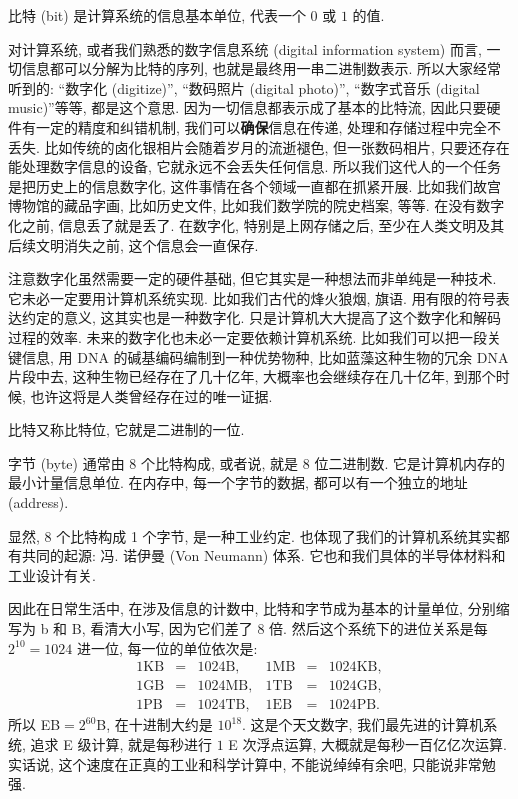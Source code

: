 \documentclass[a4paper]{ctexart}
\begin{document}
{ 比特 (bit) 是计算系统的信息基本单位,
代表一个 $0$ 或 $1$ 的值.

对计算系统, 或者我们熟悉的数字信息系统
(digital information system) 而言, 一切信息都可以分解为比特的序列,
也就是最终用一串二进制数表示. 所以大家经常听到的: ``数字化 (digitize)'',
``数码照片 (digital photo)'', ``数字式音乐 (digital music)''等等,
都是这个意思. 因为一切信息都表示成了基本的比特流,
因此只要硬件有一定的精度和纠错机制, 我们可以{\bf 确保}信息在传递,
处理和存储过程中完全不丢失. 比如传统的卤化银相片会随着岁月的流逝褪色,
但一张数码相片, 只要还存在能处理数字信息的设备, 它就永远不会丢失任何信息.
所以我们这代人的一个任务是把历史上的信息数字化, 这件事情在各个领域一直都在抓紧开展.
比如我们故宫博物馆的藏品字画, 比如历史文件, 比如我们数学院的院史档案, 等等.
在没有数字化之前, 信息丢了就是丢了. 在数字化, 特别是上网存储之后,
至少在人类文明及其后续文明消失之前, 这个信息会一直保存.

注意数字化虽然需要一定的硬件基础, 但它其实是一种想法而非单纯是一种技术.
它未必一定要用计算机系统实现. 比如我们古代的烽火狼烟, 旗语. 用有限的符号表达约定的意义,
这其实也是一种数字化. 只是计算机大大提高了这个数字化和解码过程的效率.
未来的数字化也未必一定要依赖计算机系统. 比如我们可以把一段关键信息,
用 DNA 的碱基编码编制到一种优势物种, 比如蓝藻这种生物的冗余 DNA 片段中去,
这种生物已经存在了几十亿年, 大概率也会继续存在几十亿年, 到那个时候,
也许这将是人类曾经存在过的唯一证据.

比特又称比特位, 它就是二进制的一位.

 字节 (byte) 通常由 8 个比特构成, 或者说,
就是 8 位二进制数. 它是计算机内存的最小计量信息单位. 在内存中, 每一个字节的数据,
都可以有一个独立的地址 (address).

显然, 8 个比特构成 1 个字节, 是一种工业约定.
也体现了我们的计算机系统其实都有共同的起源: 冯. 诺伊曼 (Von Neumann)
体系. 它也和我们具体的半导体材料和工业设计有关.

因此在日常生活中, 在涉及信息的计数中, 比特和字节成为基本的计量单位,
分别缩写为 b 和 B, 看清大小写, 因为它们差了 8 倍.
然后这个系统下的进位关系是每 $2^{10} = 1024$ 进一位, 每一位的单位依次是:
$$
\begin{array}{rcllrcl}
1 \mbox{KB} &=& 1024 \mbox{B},& 1 \mbox{MB} &=& 1024 \mbox{KB},\\
1 \mbox{GB} &=& 1024 \mbox{MB},& 1 \mbox{TB} &=& 1024 \mbox{GB},\\
1 \mbox{PB} &=& 1024 \mbox{TB},& 1 \mbox{EB} &=& 1024 \mbox{PB}.
\end{array}
$$
所以 EB$=2^{60}$B, 在十进制大约是 $10^{18}$. 这是个天文数字,
我们最先进的计算机系统, 追求 E 级计算, 就是每秒进行 $1$ E 次浮点运算,
大概就是每秒一百亿亿次运算. 实话说, 这个速度在正真的工业和科学计算中,
不能说绰绰有余吧, 只能说非常勉强.

}
\end{document}
